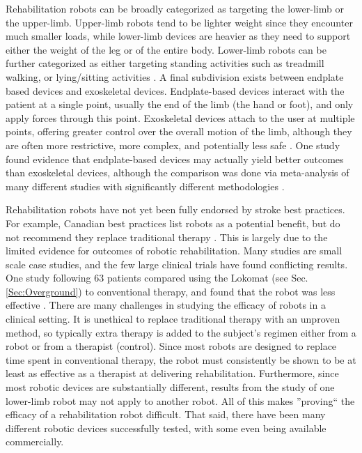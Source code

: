 \documentclass[12pt]{report}
\begin{document}
	Rehabilitation robots can be broadly categorized as targeting the lower-limb or the upper-limb. Upper-limb robots tend to be lighter weight since they encounter much smaller loads, while lower-limb devices are heavier as they need to support either the weight of the leg or of the entire body. Lower-limb robots can be further categorized as either targeting standing activities such as treadmill walking, or lying/sitting activities \cite{Calabro2016}. A final subdivision exists between endplate based devices and exoskeletal devices. Endplate-based devices interact with the patient at a single point, usually the end of the limb (the hand or foot), and only apply forces through this point. Exoskeletal devices attach to the user at multiple points, offering greater control over the overall motion of the limb, although they are often more restrictive, more complex, and potentially less safe \cite{Chang2013}. One study found evidence that endplate-based devices may actually yield better outcomes than exoskeletal devices, although the comparison was done via meta-analysis of many different studies with significantly different methodologies \cite{Mehrholz2012} . 
	
	Rehabilitation robots have not yet been fully endorsed by stroke best practices. For example, Canadian best practices list robots as a potential benefit, but do not recommend they replace traditional therapy \cite{Hebert2016}. This is largely due to the limited evidence for outcomes of robotic rehabilitation. Many studies are small scale case studies, and the 
few large clinical trials have found conflicting results. One study following 63 patients compared using the Lokomat (see Sec. \ref{Sec:Overground}) to conventional therapy, and found that the robot was less effective \cite{Hidler2008}. There are many challenges in studying the efficacy of robots in a clinical setting. It is unethical to replace traditional therapy with an unproven method, so typically extra therapy is added to the subject's regimen either from a robot or from a therapist (control). Since most robots are designed to replace time spent in conventional therapy, the robot must consistently be shown to be at least as effective as a therapist at delivering rehabilitation. Furthermore, since most robotic devices are substantially different, results from the study of one lower-limb robot may not apply to another robot. All of this makes ''proving`` the efficacy of a rehabilitation robot difficult. That said, there have been many different robotic devices successfully tested, with some even being available commercially. 
	
\end{document}
